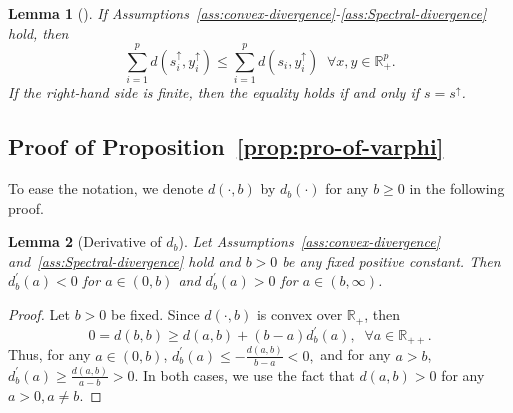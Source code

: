\documentclass[11pt]{article}
\def\R{\mathbb{R}}
\newtheorem{lemma}{Lemma}
\def\R{\mathbb{R}}
\begin{document}
\begin{lemma}[{\citet[Lemma 5]{ref:yue2024geometric}}]\label{lemma:rearrangement-ineq} If Assumptions~\ref{ass:convex-divergence}-\ref{ass:Spectral-divergence} hold, then 
\[
    \sum_{i=1}^p d(s_i^{\uparrow}, y_i^{\uparrow}) \leq \sum_{i=1}^p d(s_i, y_i^{\uparrow}) \;\;\forall x, y\in \R_+^p.
\]
If the right-hand side is finite, then 
the equality holds if and only if $s=s^{\uparrow}$.
\end{lemma}


\subsection{Proof of Proposition~\ref{prop:pro-of-varphi}}
To ease the notation, we denote $d(\cdot,b)$ by $d_b(\cdot)$ for any $b\geq 0$ in the following proof.

\begin{lemma}[Derivative of $d_b$]\label{lemma:derivative-of-db} 
Let Assumptions~\ref{ass:convex-divergence} and~\ref{ass:Spectral-divergence} hold and $b>0$ be any fixed positive constant. Then $d_b^\prime(a) < 0$ for $a\in (0,b)$ and $d_b^\prime(a) > 0$ for $a\in (b,\infty)$.
\end{lemma}



\begin{proof}
   Let $b>0$ be fixed. Since $d(\cdot, b)$ is convex over $\R_+$, then
    \[
        0=d(b,b) \geq d(a,b) + (b-a) d^\prime_b(a),\;\; \forall a\in \R_{++}.
    \]
Thus, for any $a\in (0,b)$,  
    $
        d_b^\prime(a) \leq -\frac{d(a,b)}{b-a} < 0,
    $
and for any $a>b$, $d_b^\prime(a) \geq \frac{d(a,b)}{a-b} > 0$.
    In both cases, we use the fact that $d(a,b) > 0$ for any $a>0, a\neq b$.
\end{proof}
\end{document}
